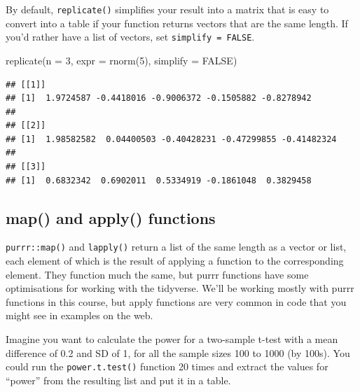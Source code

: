 \documentclass[
  oneside]{book}
\newenvironment{Shaded}{\begin{snugshade}}{\end{snugshade}}
\newcommand{\AttributeTok}[1]{\textcolor[rgb]{0.77,0.63,0.00}{#1}}
\newcommand{\ConstantTok}[1]{\textcolor[rgb]{0.00,0.00,0.00}{#1}}
\newcommand{\DecValTok}[1]{\textcolor[rgb]{0.00,0.00,0.81}{#1}}
\newcommand{\FunctionTok}[1]{\textcolor[rgb]{0.00,0.00,0.00}{#1}}
\newcommand{\NormalTok}[1]{#1}
\begin{document}
By default, \texttt{replicate()} simplifies your result into a matrix that is easy to convert into a table if your function returns vectors that are the same length. If you'd rather have a list of vectors, set \texttt{simplify\ =\ FALSE}.

\begin{Shaded}
\begin{Highlighting}[]
\FunctionTok{replicate}\NormalTok{(}\AttributeTok{n =} \DecValTok{3}\NormalTok{, }\AttributeTok{expr =} \FunctionTok{rnorm}\NormalTok{(}\DecValTok{5}\NormalTok{), }\AttributeTok{simplify =} \ConstantTok{FALSE}\NormalTok{)}
\end{Highlighting}
\end{Shaded}

\begin{verbatim}
## [[1]]
## [1]  1.9724587 -0.4418016 -0.9006372 -0.1505882 -0.8278942
## 
## [[2]]
## [1]  1.98582582  0.04400503 -0.40428231 -0.47299855 -0.41482324
## 
## [[3]]
## [1]  0.6832342  0.6902011  0.5334919 -0.1861048  0.3829458
\end{verbatim}

\hypertarget{map-apply}{%
\subsection{map() and apply() functions}\label{map-apply}}

\texttt{purrr::map()} and \texttt{lapply()} return a list of the same length as a vector or list, each element of which is the result of applying a function to the corresponding element. They function much the same, but purrr functions have some optimisations for working with the tidyverse. We'll be working mostly with purrr functions in this course, but apply functions are very common in code that you might see in examples on the web.

Imagine you want to calculate the power for a two-sample t-test with a mean difference of 0.2 and SD of 1, for all the sample sizes 100 to 1000 (by 100s). You could run the \texttt{power.t.test()} function 20 times and extract the values for ``power'' from the resulting list and put it in a table.
\end{document}
